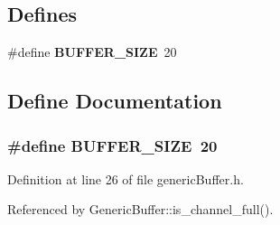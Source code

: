 \subsection*{Defines}
\begin{CompactItemize}
\item 
\#define {\bf BUFFER\_\-SIZE}~20
\end{CompactItemize}


\subsection{Define Documentation}
\subsubsection[{BUFFER\_\-SIZE}]{\setlength{\rightskip}{0pt plus 5cm}\#define BUFFER\_\-SIZE~20}\label{genericBuffer_8h_6b20d41d6252e9871430c242cb1a56e7}




Definition at line 26 of file genericBuffer.h.

Referenced by GenericBuffer::is\_\-channel\_\-full().